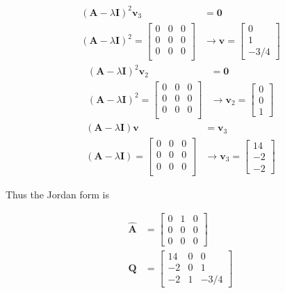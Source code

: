 \begin{itemize}
\begin{align*}
 (\mathbf{A}-\lambda \mathbf{I})^2 \mathbf{v}_3& = \mathbf{0} \\
 (\mathbf{A}-\lambda \mathbf{I})^2 = \begin{bmatrix}
  0 & 0 & 0\\
  0 & 0 & 0\\
  0 & 0 & 0\\
 \end{bmatrix}
&\rightarrow \mathbf{v}= \begin{bmatrix}
                            0\\1\\-3/4
                           \end{bmatrix}
\end{align*}
\begin{align*}
 (\mathbf{A}-\lambda \mathbf{I})^2 \mathbf{v}_2& = \mathbf{0} \\
 (\mathbf{A}-\lambda \mathbf{I})^2 = \begin{bmatrix}
  0 & 0 & 0 \\
  0 & 0 & 0\\
  0 & 0 & 0\\
 \end{bmatrix}
&\rightarrow \mathbf{v}_2= \begin{bmatrix}
                            0\\0\\1
                           \end{bmatrix}
\end{align*}
\begin{align*}
 (\mathbf{A}-\lambda \mathbf{I}) \mathbf{v}& = \mathbf{v}_3 \\
 (\mathbf{A}-\lambda \mathbf{I}) = \begin{bmatrix}
  0 & 0 & 0\\
  0 & 0 & 0\\
  0 & 0 & 0\\
 \end{bmatrix}
&\rightarrow \mathbf{v}_3= \begin{bmatrix}
                            14\\-2\\-2
                           \end{bmatrix}
\end{align*}

 Thus the Jordan form is

 \begin{align*}
 \hat {\mathbf{A}} &= \begin{bmatrix}
                       0 & 1 & 0 \\
                       0 & 0 & 0 \\
                       0 & 0 & 0
                      \end{bmatrix}\\
  \mathbf{Q} &= \begin{bmatrix}
   14& 0 & 0\\
   -2&0 & 1\\
   -2 & 1 &-3/4
  \end{bmatrix}
 \end{align*}


\end{itemize}
